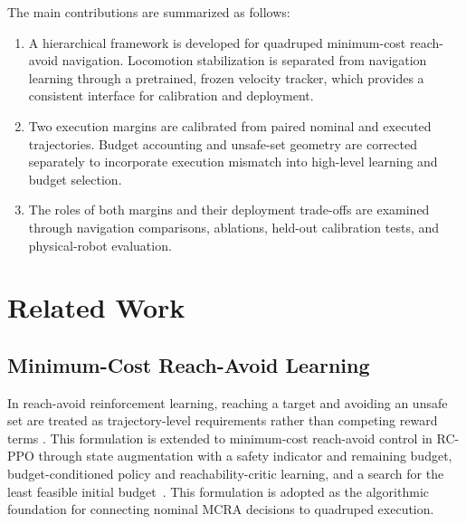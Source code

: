 \documentclass[conference]{IEEEtran}
\begin{document}
The main contributions are summarized as follows:
\begin{enumerate}
\item A hierarchical framework is developed for quadruped minimum-cost reach-avoid
      navigation. Locomotion stabilization is separated from navigation learning
      through a pretrained, frozen velocity tracker, which provides a consistent
      interface for calibration and deployment.
\item Two execution margins are calibrated from paired nominal and executed
      trajectories. Budget accounting and unsafe-set geometry are corrected
      separately to incorporate execution mismatch into high-level learning and
      budget selection.
\item The roles of both margins and their deployment trade-offs are examined
      through navigation comparisons, ablations, held-out calibration tests, and
      physical-robot evaluation.
\end{enumerate}

\section{Related Work}
\subsection{Minimum-Cost Reach-Avoid Learning}
In reach-avoid reinforcement learning, reaching a target and avoiding an unsafe
set are treated as trajectory-level requirements rather than competing reward terms
\cite{bansal2017,hsu2021,ganai2023}. This formulation is extended to minimum-cost
reach-avoid control in RC-PPO through state augmentation with a safety indicator
and remaining budget, budget-conditioned policy and reachability-critic learning,
and a search for the least feasible initial budget~\cite{so2024}. This formulation
is adopted as the algorithmic foundation for connecting nominal MCRA decisions
to quadruped execution.
\end{document}
